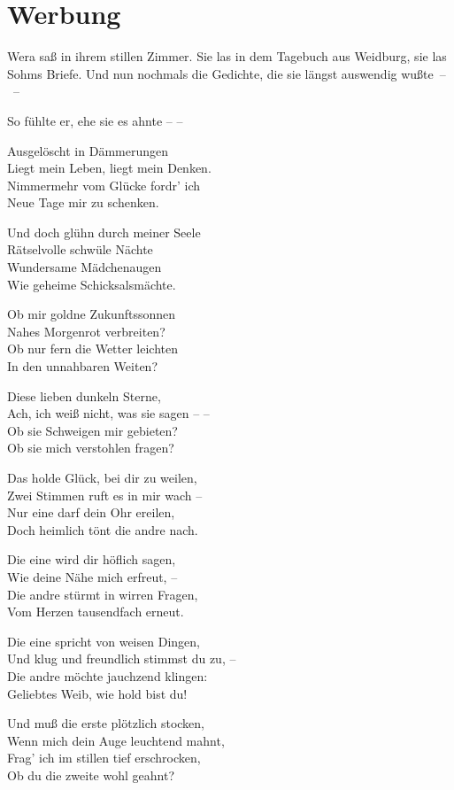 \section{Werbung}

Wera saß in ihrem stillen Zimmer. Sie las in dem Tagebuch aus
Weidburg, sie las Sohms Briefe. Und nun nochmals die Gedichte, die
sie längst auswendig wußte~–~–

So fühlte er, ehe sie es ahnte – –


\begin{liebesgedicht}
Ausgelöscht in Dämmerungen\\
Liegt mein Leben, liegt mein Denken.\\
Nimmermehr vom Glücke fordr' ich\\
Neue Tage mir zu schenken.

Und doch glühn durch meiner Seele\\
Rätselvolle schwüle Nächte\\
Wundersame Mädchenaugen\\
Wie geheime Schicksalsmächte.

Ob mir goldne Zukunftssonnen\\
Nahes Morgenrot verbreiten?\\
Ob nur fern die Wetter leichten\\
In den unnahbaren Weiten?

Diese lieben dunkeln Sterne,\\
Ach, ich weiß nicht, was sie sagen – –\\
Ob sie Schweigen mir gebieten?\\
Ob sie mich verstohlen fragen?
\end{liebesgedicht} 

\begin{liebesgedicht}
Das holde Glück, bei dir zu weilen,\\
Zwei Stimmen ruft es in mir wach –\\
Nur eine darf dein Ohr ereilen,\\
Doch heimlich tönt die andre nach.

Die eine wird dir höflich sagen,\\
Wie deine Nähe mich erfreut, –\\
Die andre stürmt in wirren Fragen,\\
Vom Herzen tausendfach erneut.

Die eine spricht von weisen Dingen,\\
Und klug und freundlich stimmst du zu, –\\
Die andre möchte jauchzend klingen:\\
Geliebtes Weib, wie hold bist du!

Und muß die erste plötzlich stocken,\\
Wenn mich dein Auge leuchtend mahnt,\\
Frag' ich im stillen tief erschrocken,\\
Ob du die zweite wohl geahnt?
\end{liebesgedicht}

